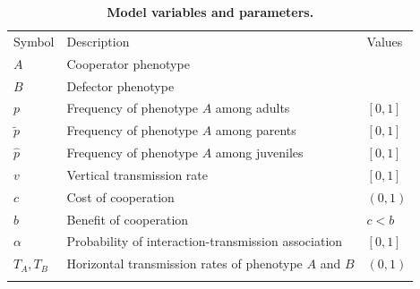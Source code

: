 \documentclass[12pt]{extarticle}
\begin{document}
{%
\bigskip
\begin{table}[h]
\centering
\caption{\textbf{Model variables and parameters.}
}
\begin{tabular}{lll}
\toprule
Symbol & Description & Values \\ \cmidrule(r){1-3}
$A$ & Cooperator phenotype & \\
$B$ & Defector phenotype & \\
$p$ & Frequency of phenotype $A$ among adults & $[0,1]$ \\
$\tilde p$ & Frequency of phenotype $A$ among parents & $[0,1]$ \\
$\hat p$ & Frequency of phenotype $A$ among juveniles & $[0,1]$ \\
$v$ & Vertical transmission rate & $[0,1]$ \\
$c$ & Cost of cooperation & $(0,1)$ \\
$b$ & Benefit of cooperation & $c<b$ \\
$\alpha$ & Probability of interaction-transmission association & $[0,1]$ \\
$T_A, T_B$ & Horizontal transmission rates of phenotype $A$ and $B$ & $(0,1)$ \\
\\ \bottomrule
\end{tabular}
\label{table:vars_params}
\end{table}

\newpage


}
\end{document}
